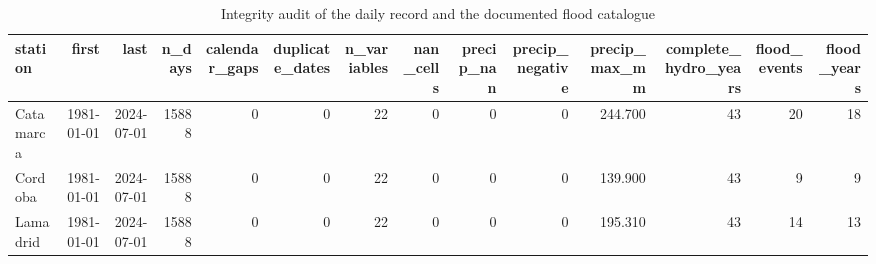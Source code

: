 \begin{table}[t]
\centering
\caption{Integrity audit of the daily record and the documented flood catalogue}
\label{tab:audit}
\begin{tabular}{lrrrrrrrrrrrrr}
\toprule
station & first & last & n\_days & calendar\_gaps & duplicate\_dates & n\_variables & nan\_cells & precip\_nan & precip\_negative & precip\_max\_mm & complete\_hydro\_years & flood\_events & flood\_years \\
\midrule
Catamarca & 1981-01-01 & 2024-07-01 & 15888 & 0 & 0 & 22 & 0 & 0 & 0 & 244.700 & 43 & 20 & 18 \\
Cordoba & 1981-01-01 & 2024-07-01 & 15888 & 0 & 0 & 22 & 0 & 0 & 0 & 139.900 & 43 & 9 & 9 \\
Lamadrid & 1981-01-01 & 2024-07-01 & 15888 & 0 & 0 & 22 & 0 & 0 & 0 & 195.310 & 43 & 14 & 13 \\
\bottomrule
\end{tabular}
\end{table}


